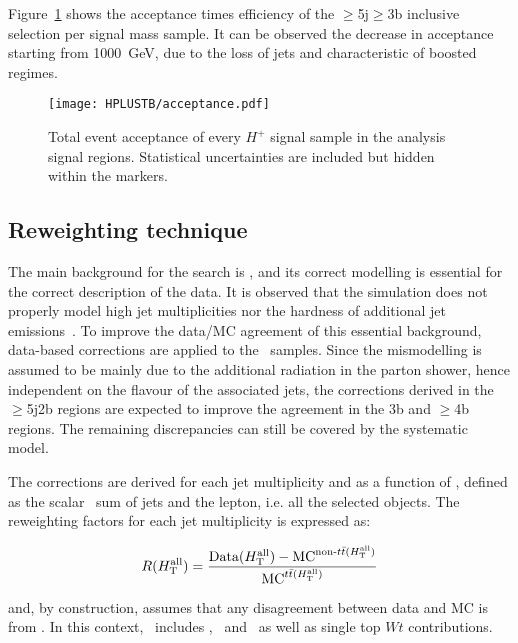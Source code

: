 Figure~\ref{Hplustb:acceptance} shows the acceptance times efficiency of the $\geq$5j$\geq$3b inclusive selection per signal mass sample. It can be observed the decrease in acceptance starting from 1000~GeV, due to the loss of jets and characteristic of boosted regimes.

\begin{figure}[htbp]
    \RawFloats
    \begin{center}
    \texttt{[image: HPLUSTB/acceptance.pdf]}
    \caption{
        Total event acceptance of every $H^+$ signal sample in the analysis signal regions. Statistical uncertainties are included but hidden within the markers.
    }
    \label{Hplustb:acceptance}
    \end{center}
\end{figure}

\clearpage
\subsection{Reweighting technique}
\label{Hplustb:secRW}
The main background for the search is \ttjets, and its correct modelling is essential for the correct description of the data. It is observed that the simulation does not properly model high jet multiplicities nor the hardness of additional jet emissions~\cite{ATL-PHYS-PUB-2018-009,10.1007/JHEP01(2021)033}.
To improve the data/MC agreement of this essential background, data-based corrections are applied to the \ttbar\ samples. Since the mismodelling is assumed to be mainly due to the additional radiation in the parton shower, hence independent on the flavour of the associated jets, the corrections derived in the $\geq$5j2b regions are expected to improve the agreement in the 3b and $\geq$4b regions. The remaining discrepancies can still be covered by the systematic model.

The corrections are derived for each jet multiplicity and as a function of \HTall, defined as the scalar \pT\ sum of jets and the lepton, i.e. all the selected objects. The reweighting factors for each jet multiplicity is expressed as:

\begin{equation}
    \label{Hplustb:RWeq}
    R(H_{\text{T}}^{\text{all}})=\frac{ \text{Data}(H_{\text{T}}^{\text{all}}) - \text{MC}^{\text{non-\ensuremath{t\bar{t}}}(H_{\text{T}}^{\text{all}})} }{\text{MC}^{\text{\ensuremath{t\bar{t}}}(H_{\text{T}}^{\text{all}})}}
\end{equation}

and, by construction, assumes that any disagreement between data and MC is from \ttbar. In this context, \ttbar\ includes \ttb, \ttc\ and \ttl\ as well as single top $Wt$ contributions. 

